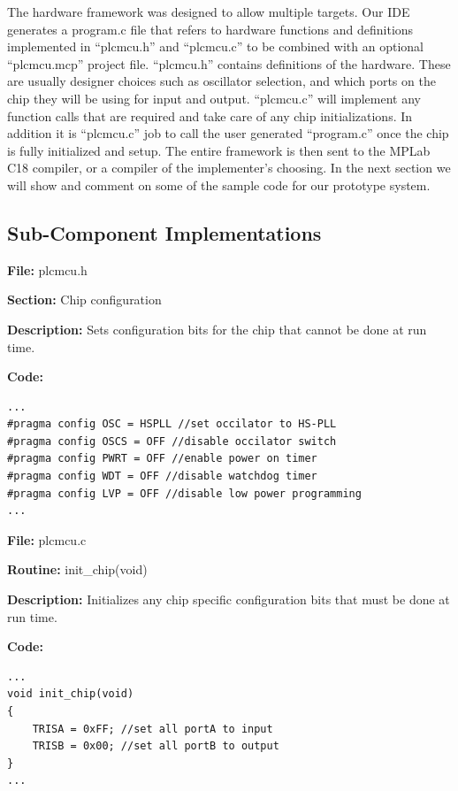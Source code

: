 The hardware framework was designed to allow multiple targets. Our IDE generates 
a program.c file that refers to hardware functions and definitions implemented 
in ``plcmcu.h'' and ``plcmcu.c'' to be combined with an optional ``plcmcu.mcp'' 
project file. ``plcmcu.h'' contains definitions of the hardware. These are usually designer choices such as oscillator selection, and which ports on the chip they will be using for input and output. ``plcmcu.c'' will implement any function calls that are required and take care of any chip initializations. In addition it is ``plcmcu.c'' job to call the user generated ``program.c'' once the chip is fully initialized and setup. The entire framework is then sent to the MPLab C18 compiler, or a compiler of the implementer's choosing. In the next section we will show and comment on some of the sample code for our prototype system.


\subsection{Sub-Component Implementations} 

\noindent\textbf{File:} plcmcu.h

\noindent\textbf{Section:} Chip configuration 

\noindent\textbf{Description:} Sets configuration bits for the chip that cannot be done at run time.

\noindent\textbf{Code:}



\begin{lstlisting}[frame=single]
...
#pragma config OSC = HSPLL //set occilator to HS-PLL
#pragma config OSCS = OFF //disable occilator switch
#pragma config PWRT = OFF //enable power on timer
#pragma config WDT = OFF //disable watchdog timer
#pragma config LVP = OFF //disable low power programming
...
\end{lstlisting}



\noindent\textbf{File:} plcmcu.c

\noindent\textbf{Routine:} init\_chip(void)

\noindent\textbf{Description:} Initializes any chip specific configuration bits that must be done at run time.

\noindent\textbf{Code:}



\begin{lstlisting}[frame=single]
...
void init_chip(void)
{	
	TRISA = 0xFF; //set all portA to input
	TRISB = 0x00; //set all portB to output
}
...
\end{lstlisting}



